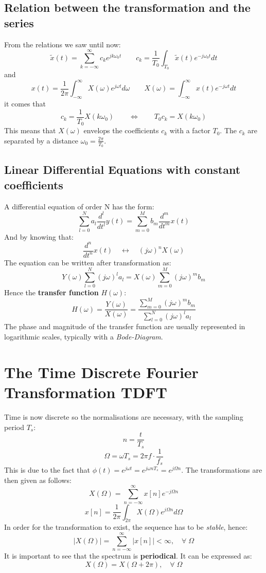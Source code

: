 \documentclass[10pt,a4paper]{article}
\begin{document}
\subsection{Relation between the transformation and the series}
From the relations we saw until now: 
$$
\tilde{x}(t) = \sum_{k=-\infty}^{\infty}{c_ke^{j k \omega_0 t}}
\qquad
c_k = \frac{1}{T_0} \int_{T_0}{\tilde{x}(t) e^{-j \omega_0 t} dt}
$$
and
$$
x(t) = \frac{1}{2\pi} \int_{-\infty}^{\infty} X(\omega) e^{j \omega t} d\omega
\qquad
X(\omega) = \int_{-\infty}^{\infty} x(t) e^{-j \omega t} dt
$$
it comes that
$$
\boxed{
c_k = \frac{1}{T_0} X(k \omega_0) \qquad \Leftrightarrow \qquad T_0 c_k = X(k \omega_0)
}
$$
This means that $X(\omega)$ envelops the coefficients $c_k$ with a factor $T_0$. The $c_k$ are separated by a distance $\omega_0 = \frac{2\pi}{T_0}$.

\subsection{Linear Differential Equations with constant coefficients}
A differential equation of order N has the form: 
$$
\sum_{l=0}^{N} a_l \frac{d^l}{dt^l}y(t) = \sum_{m=0}^{M} b_m \frac{d^m}{dt^m}x(t) 
$$
And by knowing that:
$$
\frac{d^n}{dt^n}x(t) \quad \longleftrightarrow \quad (j\omega)^nX(\omega)
$$
The equation can be written after transformation as:
$$
Y(\omega)\sum_{l=0}^{N}(j\omega)^l a_l = X(\omega)\sum_{m=0}^{M}(j\omega)^m b_m
$$
Hence the \textbf{transfer function} $H(\omega)$: 
$$
\boxed{
H(\omega) = \frac{Y(\omega)}{X(\omega)}
		  = \frac{\sum_{m=0}^{M}(j\omega)^m b_m}
		         {\sum_{l=0}^{N}(j\omega)^l a_l}
}
$$
The phase and magnitude of the transfer function are usually represented in logarithmic scales, typically with a \textit{Bode-Diagram}. 

\section{The Time Discrete Fourier Transformation TDFT}
Time is now discrete so the normalisations are necessary, with the sampling period $T_s$: 
$$
n = \frac{t}{T_s}
$$
$$
\Omega = \omega T_s = 2\pi f \cdot \frac{1}{f_s}
$$
This is due to the fact that $ \phi(t) = e^{j \omega t} = e^{j \omega nT_s} = e^{j \Omega n} $.
The transformations are then given as follows: 
$$
\boxed{
X(\Omega) = \sum_{n=-\infty}^{\infty} x[n] e^{-j \Omega n}
}
$$
$$
\boxed{
x[n] = \frac{1}{2\pi} \int_{2\pi} X(\Omega)e^{j \Omega n} d\Omega
}
$$
In order for the transformation to exist, the sequence has to be \textit{stable}, hence:
$$
\vert X(\Omega) \vert = \sum_{n=-\infty}^{\infty} \vert x[n] \vert < \infty, \quad \forall \; \Omega
$$
It is important to see that the spectrum is \textbf{periodical}. It can be expressed as:
$$
\boxed{
X(\Omega) = X(\Omega + 2\pi), \quad \forall \; \Omega
}
$$
\end{document}
